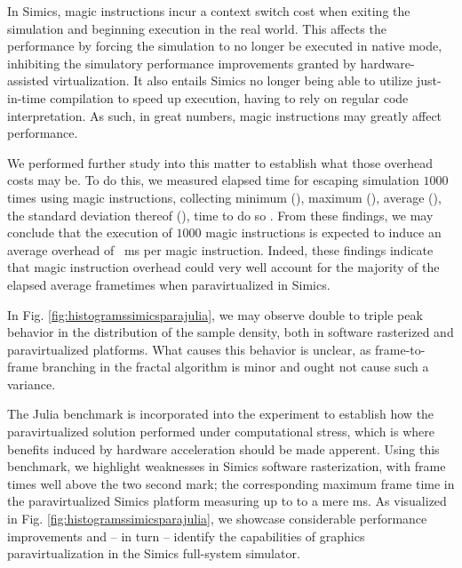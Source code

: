 In Simics, magic instructions incur a context switch cost when exiting the simulation and beginning execution in the real world.
This affects the performance by forcing the simulation to no longer be executed in native mode, inhibiting the simulatory performance improvements granted by hardware-assisted virtualization.
It also entails Simics no longer being able to utilize just-in-time compilation to speed up execution, having to rely on regular code interpretation.
As such, in great numbers, magic instructions may greatly affect performance.

We performed further study into this matter to establish what those overhead costs may be.
To do this, we measured elapsed time for escaping simulation $1000$ times using magic instructions, collecting minimum (), maximum (), average (), the standard deviation thereof (), time to do so .
From these findings, we may conclude that the execution of $1000$ magic instructions is expected to induce an average overhead of ~ms per magic instruction.
Indeed, these findings indicate that magic instruction overhead could very well account for the majority of the elapsed average frametimes when paravirtualized in Simics.

In Fig. \ref{fig:histogramssimicsparajulia}, we may observe double to triple peak behavior in the distribution of the sample density, both in software rasterized and paravirtualized platforms.
What causes this behavior is unclear, as frame-to-frame branching in the fractal algorithm is minor and ought not cause such a variance.

The Julia benchmark is incorporated into the experiment to establish how the paravirtualized solution performed under computational stress, which is where benefits induced by hardware acceleration should be made apperent.
Using this benchmark, we highlight weaknesses in Simics software rasterization, with frame times well above the two second mark; the corresponding maximum frame time in the paravirtualized Simics platform measuring up to to a mere  ms.
As visualized in Fig. \ref{fig:histogramssimicsparajulia}, we showcase considerable performance improvements and -- in turn -- identify the capabilities of graphics paravirtualization in the Simics full-system simulator.

